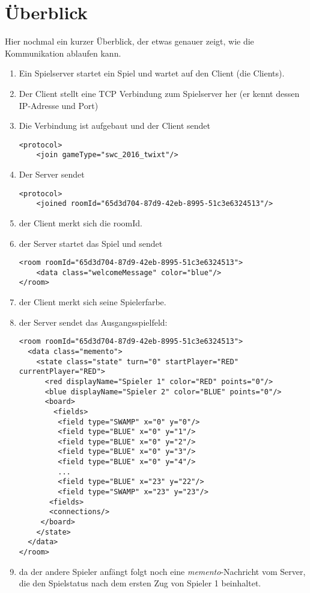 \documentclass[12pt,a4paper, ngerman, oneside]{scrartcl}
\begin{document}
\newpage
\part{\"Uberblick}
Hier nochmal ein kurzer \"Uberblick, der etwas genauer zeigt, wie die
Kommunikation ablaufen kann.\bigskip\\

\begin{enumerate}
\item Ein Spielserver startet ein Spiel und wartet auf den Client (die Clients).
\item Der Client stellt eine TCP Verbindung zum Spielserver her (er kennt dessen IP-Adresse und Port)
\item Die Verbindung ist aufgebaut und der Client sendet \begin{verbatim}
<protocol>
    <join gameType="swc_2016_twixt"/>
\end{verbatim}
\item Der Server sendet \begin{verbatim}
<protocol>
    <joined roomId="65d3d704-87d9-42eb-8995-51c3e6324513"/>
\end{verbatim}
\item der Client merkt sich die roomId.
\item der Server startet das Spiel und sendet \begin{verbatim}
<room roomId="65d3d704-87d9-42eb-8995-51c3e6324513">
    <data class="welcomeMessage" color="blue"/>
</room>
\end{verbatim}
\item der Client merkt sich seine Spielerfarbe.
\item der Server sendet das Ausgangsspielfeld: 
\begin{verbatim}
<room roomId="65d3d704-87d9-42eb-8995-51c3e6324513">
  <data class="memento">
    <state class="state" turn="0" startPlayer="RED" currentPlayer="RED">
      <red displayName="Spieler 1" color="RED" points="0"/>
      <blue displayName="Spieler 2" color="BLUE" points="0"/>
      <board>
        <fields>
         <field type="SWAMP" x="0" y="0"/>
         <field type="BLUE" x="0" y="1"/>
         <field type="BLUE" x="0" y="2"/>
         <field type="BLUE" x="0" y="3"/>
         <field type="BLUE" x="0" y="4"/>
         ...
         <field type="BLUE" x="23" y="22"/>
         <field type="SWAMP" x="23" y="23"/>
       <fields>
       <connections/> 
     </board>
    </state>
  </data>
</room>
\end{verbatim}
\item da der andere Spieler anf\"angt folgt noch eine \textit{memento}-Nachricht vom Server, die den Spielstatus nach dem ersten Zug von Spieler 1 beinhaltet.

\end{enumerate}
\end{document}
